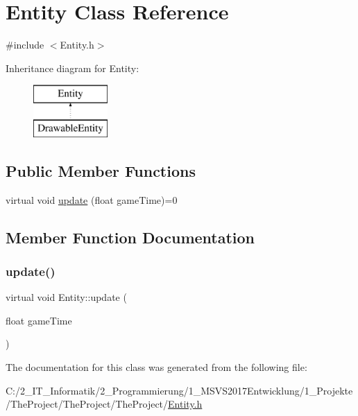 \hypertarget{class_entity}{}\section{Entity Class Reference}
\label{class_entity}


{\ttfamily \#include $<$Entity.\+h$>$}

Inheritance diagram for Entity\+:\begin{figure}[H]
\begin{center}
\leavevmode
\includegraphics[height=2.000000cm]{class_entity}
\end{center}
\end{figure}
\subsection*{Public Member Functions}
\begin{DoxyCompactItemize}
\item 
virtual void \mbox{\hyperlink{class_entity_a1b842a76a85cd4e4604b253094324b8f}{update}} (float game\+Time)=0
\end{DoxyCompactItemize}


\subsection{Member Function Documentation}
\mbox{\label{class_entity_a1b842a76a85cd4e4604b253094324b8f}} 
\subsubsection{\texorpdfstring{update()}{update()}}
{\footnotesize\ttfamily virtual void Entity\+::update (\begin{DoxyParamCaption}\item[{float}]{game\+Time }\end{DoxyParamCaption})\hspace{0.3cm}{\ttfamily [pure virtual]}}



The documentation for this class was generated from the following file\+:\begin{DoxyCompactItemize}
\item 
C\+:/2\+\_\+\+I\+T\+\_\+\+Informatik/2\+\_\+\+Programmierung/1\+\_\+\+M\+S\+V\+S2017\+Entwicklung/1\+\_\+\+Projekte/\+The\+Project/\+The\+Project/\+The\+Project/\mbox{\hyperlink{_entity_8h}{Entity.\+h}}\end{DoxyCompactItemize}
